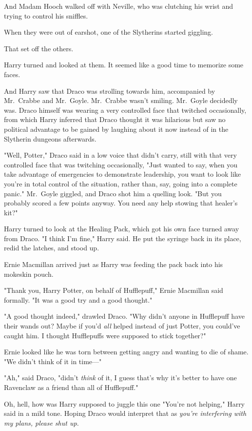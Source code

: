 And Madam Hooch walked off with Neville, who was clutching his wrist and trying
to control his sniffles.

When they were out of earshot, one of the Slytherins started giggling.

That set off the others.

Harry turned and looked at them. It seemed like a good time to memorize some
faces.

And Harry saw that Draco was strolling towards him, accompanied by Mr.~Crabbe
and Mr.~Goyle. Mr.~Crabbe wasn't smiling. Mr.~Goyle decidedly was. Draco
himself was wearing a very controlled face that twitched occasionally, from
which Harry inferred that Draco thought it was hilarious but saw no political
advantage to be gained by laughing about it now instead of in the Slytherin
dungeons afterwards.

"Well, Potter," Draco said in a low voice that didn't carry, still with that
very controlled face that was twitching occasionally, "Just wanted to say, when
you take advantage of emergencies to demonstrate leadership, you want to look
like you're in total control of the situation, rather than, say, going into a
complete panic." Mr.~Goyle giggled, and Draco shot him a quelling look. "But
you probably scored a few points anyway. You need any help stowing that
healer's kit?"

Harry turned to look at the Healing Pack, which got his own face turned away
from Draco. "I think I'm fine," Harry said. He put the syringe back in its
place, redid the latches, and stood up.

Ernie Macmillan arrived just as Harry was feeding the pack back into his
mokeskin pouch.

"Thank you, Harry Potter, on behalf of Hufflepuff," Ernie Macmillan said
formally. "It was a good try and a good thought."

"A good thought indeed," drawled Draco. "Why didn't anyone in Hufflepuff have
their wands out? Maybe if you'd \emph{all} helped instead of just Potter, you
could've caught him. I thought Hufflepuffs were supposed to stick together?"

Ernie looked like he was torn between getting angry and wanting to die of
shame. "We didn't think of it in time\mbox{---}"

"Ah," said Draco, "didn't \emph{think} of it, I guess that's why it's better to
have one Ravenclaw as a friend than all of Hufflepuff."

Oh, hell, how was Harry supposed to juggle this one{\el} "You're not
helping," Harry said in a mild tone. Hoping Draco would interpret that as
\emph{you're interfering with my plans, please shut up.}

